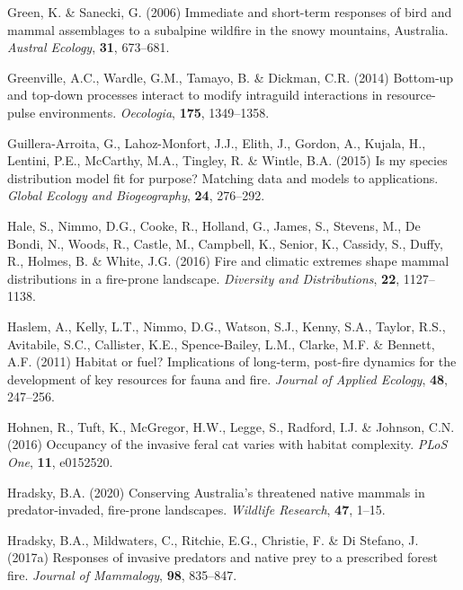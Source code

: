 \documentclass[]{elsarticle} %
\begin{document}
\leavevmode\hypertarget{ref-green2006immediate}{}%
Green, K. \& Sanecki, G. (2006) Immediate and short-term responses of bird and mammal assemblages to a subalpine wildfire in the snowy mountains, Australia. \emph{Austral Ecology}, \textbf{31}, 673--681.

\leavevmode\hypertarget{ref-greenville2014bottom}{}%
Greenville, A.C., Wardle, G.M., Tamayo, B. \& Dickman, C.R. (2014) Bottom-up and top-down processes interact to modify intraguild interactions in resource-pulse environments. \emph{Oecologia}, \textbf{175}, 1349--1358.

\leavevmode\hypertarget{ref-guillera2015my}{}%
Guillera-Arroita, G., Lahoz-Monfort, J.J., Elith, J., Gordon, A., Kujala, H., Lentini, P.E., McCarthy, M.A., Tingley, R. \& Wintle, B.A. (2015) Is my species distribution model fit for purpose? Matching data and models to applications. \emph{Global Ecology and Biogeography}, \textbf{24}, 276--292.

\leavevmode\hypertarget{ref-hale2016fire}{}%
Hale, S., Nimmo, D.G., Cooke, R., Holland, G., James, S., Stevens, M., De Bondi, N., Woods, R., Castle, M., Campbell, K., Senior, K., Cassidy, S., Duffy, R., Holmes, B. \& White, J.G. (2016) Fire and climatic extremes shape mammal distributions in a fire-prone landscape. \emph{Diversity and Distributions}, \textbf{22}, 1127--1138.

\leavevmode\hypertarget{ref-haslem2011habitat}{}%
Haslem, A., Kelly, L.T., Nimmo, D.G., Watson, S.J., Kenny, S.A., Taylor, R.S., Avitabile, S.C., Callister, K.E., Spence-Bailey, L.M., Clarke, M.F. \& Bennett, A.F. (2011) Habitat or fuel? Implications of long-term, post-fire dynamics for the development of key resources for fauna and fire. \emph{Journal of Applied Ecology}, \textbf{48}, 247--256.

\leavevmode\hypertarget{ref-hohnen2016occupancy}{}%
Hohnen, R., Tuft, K., McGregor, H.W., Legge, S., Radford, I.J. \& Johnson, C.N. (2016) Occupancy of the invasive feral cat varies with habitat complexity. \emph{PLoS One}, \textbf{11}, e0152520.

\leavevmode\hypertarget{ref-hradsky2020conserving}{}%
Hradsky, B.A. (2020) Conserving Australia's threatened native mammals in predator-invaded, fire-prone landscapes. \emph{Wildlife Research}, \textbf{47}, 1--15.

\leavevmode\hypertarget{ref-hradsky2017responses}{}%
Hradsky, B.A., Mildwaters, C., Ritchie, E.G., Christie, F. \& Di Stefano, J. (2017a) Responses of invasive predators and native prey to a prescribed forest fire. \emph{Journal of Mammalogy}, \textbf{98}, 835--847.
\end{document}
